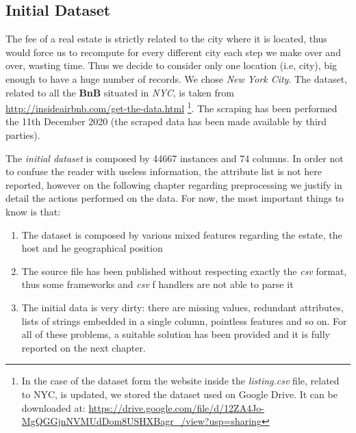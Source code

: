 \subsection{Initial Dataset}
The fee of a real estate is strictly related to the city where it is located, thus would force us to recompute for every different city each step we make over and over, wasting time. Thus we decide to consider only one location (i.e, city), big enough to have a huge number of records. We chose \textit{New York City}.
The dataset, related to all the \textbf{BnB} situated in \textit{NYC}, is taken from \url{http://insideairbnb.com/get-the-data.html} \footnote{In the case of the dataset form the website inside the \textit{listing.csv} file, related to NYC, is updated, we stored the dataset used on Google Drive. It can be downloaded at: \url{https://drive.google.com/file/d/12ZA4Jo-MgQGGjnNVMUdDom8USHXBagr_/view?usp=sharing}}. The scraping has been performed the 11th December 2020 (the scraped data has been made available by third parties).

The \textit{initial dataset} is composed by 44667 instances and 74 columns. In order not to confuse the reader with useless information, the attribute list is not here reported, however on the following chapter regarding preprocessing we justify in detail the actions performed on the data. For now, the most important things to know is that:

\begin{enumerate}
	\item The dataset is composed by various mixed features regarding the estate, the host and he geographical position
	\item The source file has been published without respecting exactly the \textit{csv} format, thus some frameworks and \textit{csv} f handlers are not able to parse it
	\item The initial data is very dirty: there are missing values, redundant attributes, lists of strings embedded in a single column, pointless features and so on. For all of these problems, a suitable solution has been provided and it is fully reported on the next chapter.
\end{enumerate}

\medskip 
